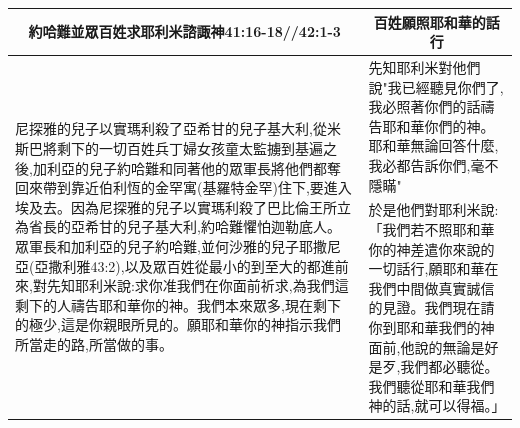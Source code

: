 \begin{table}[H]
\centering
\begin{tabular}{p{10.5cm}|p{}}\hline\hline
\multicolumn{1}{c|}{約哈難並眾百姓求耶利米諮諏神41:16-18//42:1-3}&\multicolumn{1}{c}{百姓願照耶和華的話行}\\\hline
\multirow{2}{10.8cm}{尼探雅的兒子以實瑪利殺了亞希甘的兒子基大利,從米斯巴將剩下的一切百姓兵丁婦女孩童太監擄到基遍之後,加利亞的兒子約哈難和同著他的眾軍長將他們都奪回來帶到靠近伯利恆的金罕寓(基羅特金罕)住下,要進入埃及去。因為尼探雅的兒子以實瑪利殺了巴比倫王所立為省長的亞希甘的兒子基大利,約哈難懼怕迦勒底人。眾軍長和加利亞的兒子約哈難,並何沙雅的兒子耶撒尼亞(亞撒利雅43:2),以及眾百姓從最小的到至大的都進前來,對先知耶利米說:求你准我們在你面前祈求,為我們這剩下的人禱告耶和華你的神。我們本來眾多,現在剩下的極少,這是你親眼所見的。願耶和華你的神指示我們所當走的路,所當做的事。}
&先知耶利米對他們說"我已經聽見你們了,我必照著你們的話禱告耶和華你們的神。耶和華無論回答什麼,我必都告訴你們,毫不隱瞞"\\\cline{2-2}
&於是他們對耶利米說:「我們若不照耶和華你的神差遣你來說的一切話行,願耶和華在我們中間做真實誠信的見證。我們現在請你到耶和華我們的神面前,他說的無論是好是歹,我們都必聽從。我們聽從耶和華我們神的話,就可以得福。」\\\hline
\end{tabular}
\end{table} 



